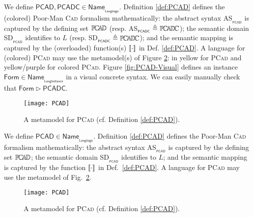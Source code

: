 \begin{olddef}
\begin{Example}
      We define $\mathsf{PCAD, PCADC} \in 
\mathsf{Name}_{_{\mathsf{Language}}}$. Definition \ref{def:PCAD} defines the 
(colored) Poor-Man \textsc{Cad} formalism mathematically: the abstract syntax 
\textsf{AS}$_{_{\mathsf{PCAD}}}$ is captured by the defining set $\mathbb{P}\!\mathbb{C}\!\mathbb{A}\!\mathbb{D} $ (resp. 
\textsf{AS}$_{_{\mathsf{PCADC}}} \triangleq \mathbb{P}\!\mathbb{C}\!\mathbb{A}\!\mathbb{D} \!\mathbb{C} $); the semantic domain 
\textsf{SD}$_{_{\mathsf{PCAD}}}$ identifies to $L$ (resp. 
\textsf{SD}$_{_{\mathsf{PCADC}}} \triangleq \mathbb{P}\!\mathbb{C}\!\mathbb{A}\!\mathbb{D} \!\mathbb{C} $); and the semantic mapping is 
captured by the (overloaded) function(s) $\llbracket \cdot \rrbracket$ in Def. \ref{def:PCAD}. A 
language for (colored) \textsc{PCad} may use the metamodel(s) of Figure 
\ref{fig:PCAD-MM}: in yellow for \textsc{PCad} and yellow/purple for colored 
\textsc{PCad}. Figure \ref{fig:PCAD-Visual} defines an instance 
$\mathsf{Form}\in\mathsf{Name}_{_{\mathsf{LangInstance}}}$ in a visual concrete 
syntax. We can easily manually check that $\mathsf{Form}\rhd \mathsf{PCADC}$.

\begin{figure}[t]
   \centering
   \texttt{[image: PCAD]}
   \caption{A metamodel for \textsc{PCad} (cf. Definition 
\ref{def:PCAD}).}%
   \label{fig:PCAD-MM}%
\end{figure}
\end{Example}
\end{olddef}

\begin{newdef}
\begin{Example}
      We define $\mathsf{PCAD} \in 
\mathsf{Name}_{_{\mathsf{Language}}}$. Definition \ref{def:PCAD} defines the 
Poor-Man \textsc{Cad} formalism mathematically: 
the abstract syntax \textsf{AS}$_{_{\mathsf{PCAD}}}$ is captured by the defining set $\mathbb{P}\!\mathbb{C}\!\mathbb{A}\!\mathbb{D} $; 
the semantic domain \textsf{SD}$_{_{\mathsf{PCAD}}}$ identifies to $L$; 
and the semantic mapping is captured by the function $\llbracket \cdot \rrbracket$ in Def.~\ref{def:PCAD}. 
A language for \textsc{PCad} may use the metamodel of Fig.~\ref{fig:PCAD-MM}. 

\begin{figure}[t]
   \centering
   \texttt{[image: PCAD]}
   \caption{A metamodel for \textsc{PCad} (cf. Definition 
\ref{def:PCAD}).}%
   \label{fig:PCAD-MM}%
\end{figure}
\end{Example}
\end{newdef}

